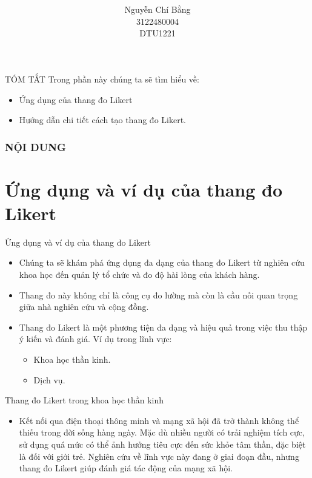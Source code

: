 \documentclass{beamer}
\title[]{\fontsize{13pt}{10pt}\selectfont {\bf \Large ỨNG DỤNG VÀ CÁCH TẠO \\ THANG ĐO LIKERT}\\}
\author[]{ Nguyễn Chí Bằng \\ 3122480004 \\ DTU1221}
\begin{document}
\begin{frame}
\titlepage
\end{frame}

\begin{frame}{TÓM TẮT}
    Trong phần này chúng ta sẽ tìm hiểu về:
    \begin{itemize}
    \item Ứng dụng của thang đo Likert
    \item Hướng dẫn chi tiết cách tạo thang đo Likert.
    \end{itemize}
    \end{frame}    

\begin{frame}
    \frametitle{NỘI DUNG}
    \tableofcontents
\end{frame}    

\section{Ứng dụng và ví dụ của thang đo Likert}
\begin{frame}{Ứng dụng và ví dụ của thang đo Likert}
\begin{itemize}
    \item Chúng ta sẽ khám phá ứng dụng đa dạng của thang đo Likert từ nghiên cứu khoa học đến quản lý tổ chức và đo độ hài lòng của khách hàng. 
    \item Thang đo này không chỉ là công cụ đo lường mà còn là cầu nối quan trọng giữa nhà nghiên cứu và cộng đồng.
    \item Thang đo Likert là một phương tiện đa dạng và hiệu quả trong việc thu thập ý kiến và đánh giá. Ví dụ trong lĩnh vực:
    \begin{itemize}
    \item Khoa học thần kinh.
    \item Dịch vụ.
\end{itemize}
\end{itemize}
\end{frame}

\begin{frame}{Thang đo Likert trong khoa học thần kinh}
    \begin{itemize}
    \item Kết nối qua điện thoại thông minh và mạng xã hội đã trở thành không thể thiếu trong đời sống hàng ngày. Mặc dù nhiều người có trải nghiệm tích cực, sử dụng quá mức có thể ảnh hưởng tiêu cực đến sức khỏe tâm thần, đặc biệt là đối với giới trẻ. Nghiên cứu về lĩnh vực này đang ở giai đoạn đầu, nhưng thang đo Likert giúp đánh giá tác động của mạng xã hội.
    \end{itemize}
\end{frame}
\end{document}
